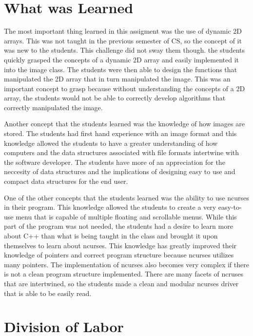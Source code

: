 \documentclass[pdftex, 11pt]{article}
\begin{document}
\section{What was Learned}

The most important thing learned in this assigment was the use of dynamic 2D arrays. This was not taught in the previous
semester of CS, so the concept of it was new to the students. This challenge did not sway them though. the students
quickly grasped the concepts of a dynamic 2D array and easily implemented it into the image class. The students were
then able to design the functions that manipulated the 2D array that in turn manipulated the image. This was an
important concept to grasp because without understanding the concepts of a 2D array, the students would not be able to
correctly develop algorithms that correctly manipulated the image. 

Another concept that the students learned was the knowledge of how images are stored. The students had first hand
experience with an image format and this knowledge allowed the students to have a greater understanding of how computers
and the data structures associated with file formats intertwine with the software developer. The students have more of
an appreciation for the neccesity of data structures and the implications of designing easy to use and compact data
structures for the end user. 

One of the other concepts that the students learned was the ability to use ncurses in their program. This knowledge
allowed the students to create a very easy-to-use menu that is capable of multiple floating and scrollable menus. While
this part of the program was not needed, the students had a desire to learn more about C++ than what is being taught in
the class and brought it upon themselves to learn about ncurses. This knowledge has greatly improved their knowledge of
pointers and correct program structure because ncurses utilizes many pointers. The implementation of ncurses also becomes
very complex if there is not a clean program structure implemented. There are many facets of ncruses that are
intertwined, so the students made a clean and modular ncurses driver that is able to be easily read.

\section{Division of Labor}
\end{document}
